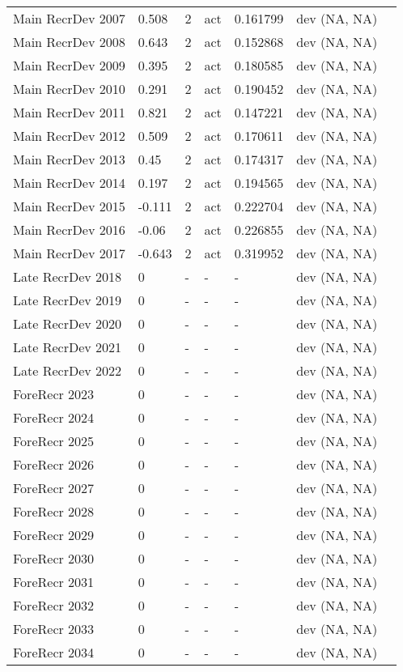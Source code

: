 \documentclass[11pt,
  english,
  letterpaper,
]{article}
\begin{document}
\begin{landscape}
\begin{longtable}[t]{>{\raggedright\arraybackslash}p{6cm}lllll>{\raggedright\arraybackslash}p{4cm}}
Main RecrDev 2007 & 0.508 & 2 & act & 0.161799 & dev (NA, NA)\\
Main RecrDev 2008 & 0.643 & 2 & act & 0.152868 & dev (NA, NA)\\
Main RecrDev 2009 & 0.395 & 2 & act & 0.180585 & dev (NA, NA)\\
Main RecrDev 2010 & 0.291 & 2 & act & 0.190452 & dev (NA, NA)\\
Main RecrDev 2011 & 0.821 & 2 & act & 0.147221 & dev (NA, NA)\\
Main RecrDev 2012 & 0.509 & 2 & act & 0.170611 & dev (NA, NA)\\
Main RecrDev 2013 & 0.45 & 2 & act & 0.174317 & dev (NA, NA)\\
Main RecrDev 2014 & 0.197 & 2 & act & 0.194565 & dev (NA, NA)\\
Main RecrDev 2015 & -0.111 & 2 & act & 0.222704 & dev (NA, NA)\\
Main RecrDev 2016 & -0.06 & 2 & act & 0.226855 & dev (NA, NA)\\
Main RecrDev 2017 & -0.643 & 2 & act & 0.319952 & dev (NA, NA)\\
Late RecrDev 2018 & 0 & - & - & - & dev (NA, NA)\\
Late RecrDev 2019 & 0 & - & - & - & dev (NA, NA)\\
Late RecrDev 2020 & 0 & - & - & - & dev (NA, NA)\\
Late RecrDev 2021 & 0 & - & - & - & dev (NA, NA)\\
Late RecrDev 2022 & 0 & - & - & - & dev (NA, NA)\\
ForeRecr 2023 & 0 & - & - & - & dev (NA, NA)\\
ForeRecr 2024 & 0 & - & - & - & dev (NA, NA)\\
ForeRecr 2025 & 0 & - & - & - & dev (NA, NA)\\
ForeRecr 2026 & 0 & - & - & - & dev (NA, NA)\\
ForeRecr 2027 & 0 & - & - & - & dev (NA, NA)\\
ForeRecr 2028 & 0 & - & - & - & dev (NA, NA)\\
ForeRecr 2029 & 0 & - & - & - & dev (NA, NA)\\
ForeRecr 2030 & 0 & - & - & - & dev (NA, NA)\\
ForeRecr 2031 & 0 & - & - & - & dev (NA, NA)\\
ForeRecr 2032 & 0 & - & - & - & dev (NA, NA)\\
ForeRecr 2033 & 0 & - & - & - & dev (NA, NA)\\
ForeRecr 2034 & 0 & - & - & - & dev (NA, NA)\\

\end{longtable}
\end{landscape}
\end{document}
